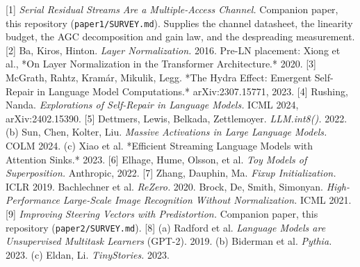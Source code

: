 \documentclass[10pt]{article}
\begin{document}
[1] \emph{Serial Residual Streams Are a Multiple-Access Channel.} Companion paper, this repository
(\texttt{paper1/SURVEY.md}). Supplies the channel datasheet, the linearity budget, the AGC decomposition
and gain law, and the despreading measurement.
[2] Ba, Kiros, Hinton. \emph{Layer Normalization.} 2016. Pre-LN placement: Xiong et al., *On Layer
Normalization in the Transformer Architecture.* 2020.
[3] McGrath, Rahtz, Kramár, Mikulik, Legg. *The Hydra Effect: Emergent Self-Repair in Language
Model Computations.* arXiv:2307.15771, 2023.
[4] Rushing, Nanda. \emph{Explorations of Self-Repair in Language Models.} ICML 2024, arXiv:2402.15390.
[5] Dettmers, Lewis, Belkada, Zettlemoyer. \emph{LLM.int8().} 2022. (b) Sun, Chen, Kolter, Liu.
\emph{Massive Activations in Large Language Models.} COLM 2024. (c) Xiao et al. *Efficient Streaming
Language Models with Attention Sinks.* 2023.
[6] Elhage, Hume, Olsson, et al. \emph{Toy Models of Superposition.} Anthropic, 2022.
[7] Zhang, Dauphin, Ma. \emph{Fixup Initialization.} ICLR 2019. Bachlechner et al. \emph{ReZero.} 2020.
Brock, De, Smith, Simonyan. \emph{High-Performance Large-Scale Image Recognition Without Normalization.}
ICML 2021.
[9] \emph{Improving Steering Vectors with Predistortion.} Companion paper, this repository
(\texttt{paper2/SURVEY.md}).
[8] (a) Radford et al. \emph{Language Models are Unsupervised Multitask Learners} (GPT-2). 2019.
(b) Biderman et al. \emph{Pythia.} 2023. (c) Eldan, Li. \emph{TinyStories.} 2023.
\end{document}
